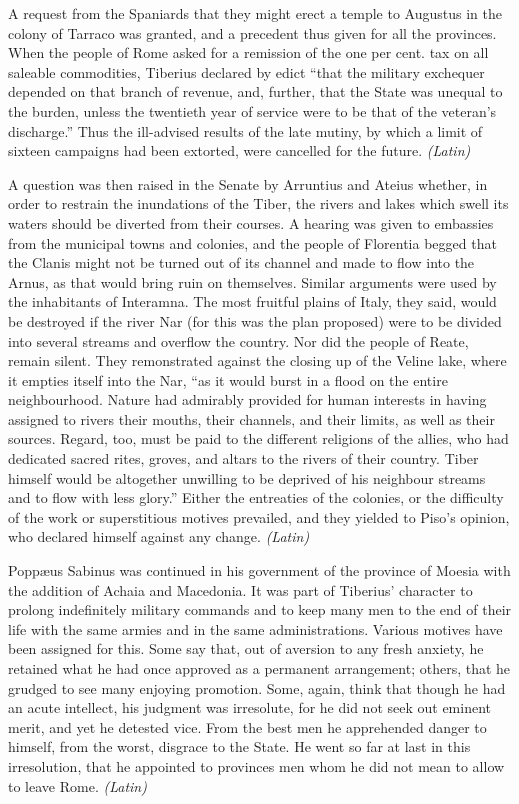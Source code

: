 
A request from the Spaniards that they might erect a temple to Augustus in the colony of Tarraco was granted, and a precedent thus given for all the provinces. When the people of Rome asked for a remission of the one per cent. tax on all saleable commodities, Tiberius declared by edict ``that the military exchequer depended on that branch of revenue, and, further, that the State was unequal to the burden, unless the twentieth year of service were to be that of the veteran's discharge.'' Thus the ill-advised results of the late mutiny, by which a limit of sixteen campaigns had been extorted, were cancelled for the future. \emph{(Latin)}


A question was then raised in the Senate by Arruntius and Ateius whether, in order to restrain the inundations of the Tiber, the rivers and lakes which swell its waters should be diverted from their courses. A hearing was given to embassies from the municipal towns and colonies, and the people of Florentia begged that the Clanis might not be turned out of its channel and made to flow into the Arnus, as that would bring ruin on themselves. Similar arguments were used by the inhabitants of Interamna. The most fruitful plains of Italy, they said, would be destroyed if the river Nar (for this was the plan proposed) were to be divided into several streams and overflow the country. Nor did the people of Reate, remain silent. They remonstrated against the closing up of the Veline lake, where it empties itself into the Nar, ``as it would burst in a flood on the entire neighbourhood. Nature had admirably provided for human interests in having assigned to rivers their mouths, their channels, and their limits, as well as their sources. Regard, too, must be paid to the different religions of the allies, who had dedicated sacred rites, groves, and altars to the rivers of their country. Tiber himself would be altogether unwilling to be deprived of his neighbour streams and to flow with less glory.'' Either the entreaties of the colonies, or the difficulty of the work or superstitious motives prevailed, and they yielded to Piso's opinion, who declared himself against any change. \emph{(Latin)}


Poppæus Sabinus was continued in his government of the province of Moesia with the addition of Achaia and Macedonia. It was part of Tiberius' character to prolong indefinitely military commands and to keep many men to the end of their life with the same armies and in the same administrations. Various motives have been assigned for this. Some say that, out of aversion to any fresh anxiety, he retained what he had once approved as a permanent arrangement; others, that he grudged to see many enjoying promotion. Some, again, think that though he had an acute intellect, his judgment was irresolute, for he did not seek out eminent merit, and yet he detested vice. From the best men he apprehended danger to himself, from the worst, disgrace to the State. He went so far at last in this irresolution, that he appointed to provinces men whom he did not mean to allow to leave Rome. \emph{(Latin)}

